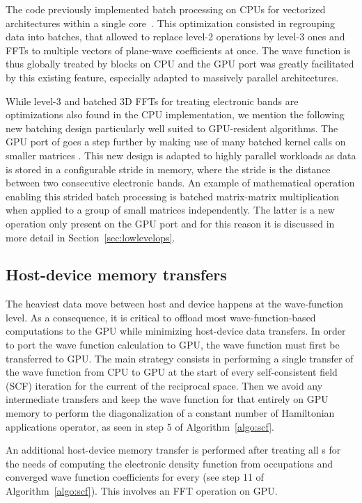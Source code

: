 \documentclass[twocolumn,superscriptaddress]{revtex4-1}
\begin{document}
The \abinit code previously implemented batch processing on CPUs for vectorized architectures within a single core~\cite{GONZE2016106, GONZE2020107042}. This optimization consisted in regrouping data into batches, that allowed to replace level-2 \blas operations by level-3 ones and FFTs to multiple vectors of plane-wave coefficients at once. The wave function is thus globally treated by blocks on CPU and the GPU port was greatly facilitated by this existing feature, especially adapted to massively parallel architectures. 

While level-3 \blas and batched 3D FFTs for treating electronic bands are optimizations also found in the CPU implementation, we mention the following new batching design particularly well suited to GPU-resident algorithms. The GPU port of \abinit goes a step further by making use of many batched kernel calls on smaller matrices \cite{dongarra_batch}. This new design is adapted to highly parallel workloads as data is stored in a configurable stride in memory, where the stride is the distance between two consecutive electronic bands. An example of mathematical operation enabling this strided batch processing is batched matrix-matrix multiplication when applied to a group of small matrices independently. The latter is a new operation only present on the GPU port and for this reason it is discussed in more detail in Section~\ref{sec:lowlevelops}. 

\subsection{Host-device memory transfers} \label{sec:transfer}

The heaviest data move between host and device happens at the wave-function level. As a consequence, it is critical to offload most wave-function-based computations to the GPU while minimizing host-device data transfers. In order to port the wave function calculation to GPU, the wave function must first be transferred to GPU. The main strategy consists in performing a single transfer of the wave function from CPU to GPU at the start of every self-consistent field (SCF) iteration for the current \kpoint of the reciprocal space. Then we avoid any intermediate transfers and keep the wave function for that \kpoint entirely on GPU memory to perform the diagonalization of a constant number of Hamiltonian applications operator, as seen in step 5 of Algorithm~\ref{algo:scf}. 

An additional host-device memory transfer is performed after treating all \kpoint{}s for the needs of computing the electronic density function from occupations and converged wave function coefficients for every \kpoint{} (see step 11 of Algorithm~\ref{algo:scf}). This involves an FFT operation on GPU.
\end{document}
